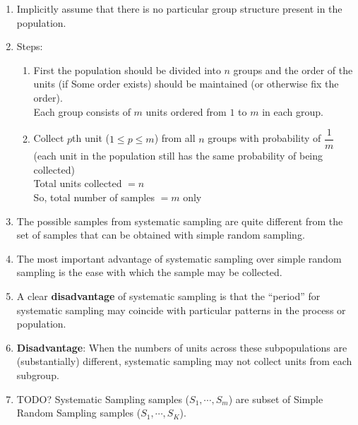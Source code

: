 \begin{enumerate}[itemsep=0.2cm]
    \item Implicitly assume that there is no particular group structure present in the population.
    \hfill \cite{statistics/book/Statistics-for-Data-Scientists/Maurits-Kaptein}

    \item Steps:
    \hfill \cite{statistics/book/Statistics-for-Data-Scientists/Maurits-Kaptein}
    \begin{enumerate}[itemsep=0.1cm]
        \item First the population should be divided into $n$ groups and the order of the units (if Some order exists) should be maintained (or otherwise fix the order).\\
        Each group consists of $m$ units ordered from $1$ to $m$ in each group.

        \item Collect $p$th unit ($1 \leq p \leq m$) from all $n$ groups with probability of $\dfrac{1}{m}$\\
        (each unit in the population still has the same probability of being collected)\\
        Total units collected $= n$\\
        So, total number of samples $= m$ only

    \end{enumerate}

    \item The possible samples from systematic sampling are quite different from the set of samples that can be obtained with simple random sampling.
    \hfill \cite{statistics/book/Statistics-for-Data-Scientists/Maurits-Kaptein}

    \item The most important advantage of systematic sampling over simple random sampling is the ease with which the sample may be collected.
    \hfill \cite{statistics/book/Statistics-for-Data-Scientists/Maurits-Kaptein}

    \item A clear \textbf{disadvantage} of systematic sampling is that the “period” for systematic sampling may coincide with particular patterns in the process or population.
    \hfill \cite{statistics/book/Statistics-for-Data-Scientists/Maurits-Kaptein}

    \item \textbf{Disadvantage}: When the numbers of units across these subpopulations are (substantially) different, systematic sampling may not collect units from each subgroup.
    \hfill \cite{statistics/book/Statistics-for-Data-Scientists/Maurits-Kaptein}

    \item TODO? Systematic Sampling samples ($S_1,\cdots,S_m$) are subset of Simple Random Sampling samples ($S_1,\cdots,S_K$).
\end{enumerate}

